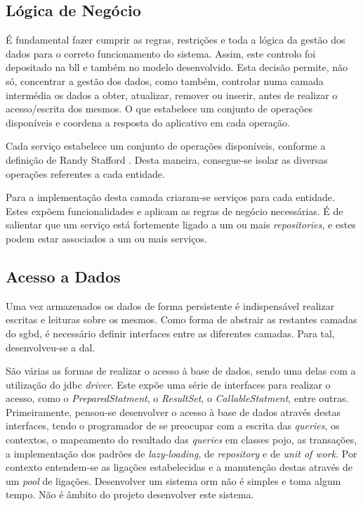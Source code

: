%
%
\subsection{Lógica de Negócio}\label{subsec332}

É fundamental fazer cumprir as regras, restrições e toda a lógica da gestão dos dados para o correto funcionamento do sistema. Assim,  este controlo foi depositado na \acrfull{bll} e também no modelo desenvolvido. Esta decisão permite, não só, concentrar a gestão dos dados, como também, controlar numa camada intermédia os dados a obter, atualizar, remover ou inserir, antes de realizar o acesso/escrita dos mesmos. O que estabelece um conjunto de operações disponíveis e coordena a resposta do aplicativo em cada operação.

Cada serviço estabelece um conjunto de operações disponíveis, conforme a definição de Randy Stafford \cite{PofEAASe2:serviceLayer}. Desta maneira, consegue-se isolar as diversas operações referentes a cada entidade. 

Para a implementação desta camada criaram-se serviços para cada entidade. Estes expõem funcionalidades e aplicam as regras de negócio necessárias. É de salientar que um serviço está fortemente ligado a um ou mais \textit{repositories}, e estes podem estar associados a um ou mais serviços.

%
%
\subsection{Acesso a Dados}\label{subsec331}

Uma vez armazenados os dados de forma persistente é indispensável realizar escritas e leituras sobre os mesmos. Como forma de abstrair as restantes camadas do \acrshort{sgbd}, é necessário definir interfaces entre as diferentes camadas. Para tal, desenvolveu-se a \acrfull{dal}.

São várias as formas de realizar o acesso à base de dados, sendo uma delas com a utilização do \acrshort{jdbc} \textit{driver}. Este expõe uma série de interfaces para realizar o acesso, como o \textit{PreparedStatment}, o \textit{ResultSet}, o \textit{CallableStatment}, entre outras. Primeiramente, pensou-se desenvolver o acesso à base de dados através destas interfaces, tendo o programador de se preocupar com a escrita das \textit{queries}, os contextos, o mapeamento do resultado das \textit{queries} em classes \acrfull{pojo}, as transações, a implementação dos padrões de \textit{lazy-loading}, de \textit{repository} e de \textit{unit of work}. Por contexto entendem-se as ligações estabelecidas e a manutenção destas através de um \textit{pool} de ligações. Desenvolver um sistema \acrfull{orm} não é simples e toma algum tempo. Não é âmbito do projeto desenvolver este sistema. 

